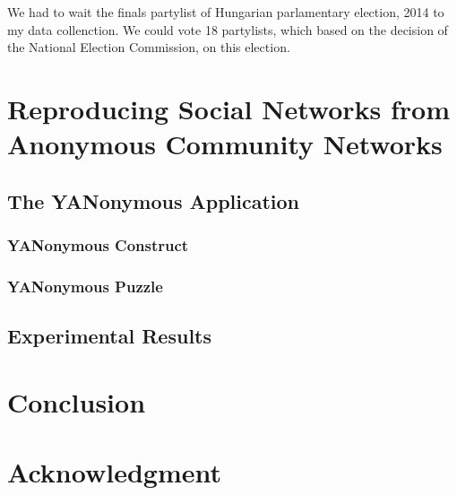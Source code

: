 \documentclass[journal]{IEEEtran}
\begin{document}
We had to wait the finals partylist of Hungarian parlamentary election, 2014  to my  data collenction. We could vote 18 partylists, which based on the decision of the National Election Commission, on this election.


\section{Reproducing Social Networks from Anonymous Community Networks}

\subsection{The YANonymous Application}



\subsubsection{YANonymous Construct}

\subsubsection{YANonymous Puzzle}

\subsection{Experimental Results}

\section{Conclusion}

\section*{Acknowledgment}






\end{document}
